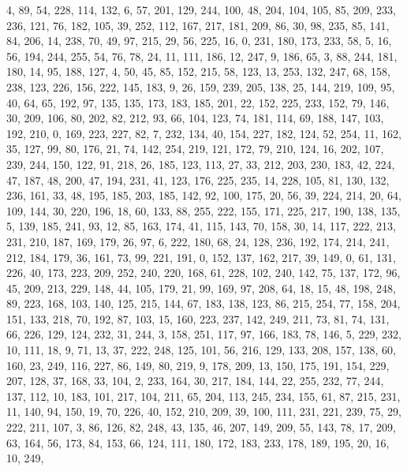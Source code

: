 \begin{DoxyCode}
       4, 89, 54, 228, 114, 132, 6, 57, 201, 129, 244, 100, 48, 204, 104, 105, 85, 209, 233, 236, 121, 76, 182, 105,
       39, 252, 112, 167, 217, 181, 209, 86, 30, 98, 235, 85, 141, 84, 206, 14, 238, 70, 49, 97, 215, 29, 56, 225,
       16, 0, 231, 180, 173, 233, 58, 5, 16, 56, 194, 244, 255, 54, 76, 78, 24, 11, 111, 186, 12, 247, 9, 186, 65,
       3, 88, 244, 181, 180, 14, 95, 188, 127, 4, 50, 45, 85, 152, 215, 58, 123, 13, 253, 132, 247, 68, 158, 238,
       123, 226, 156, 222, 145, 183, 9, 26, 159, 239, 205, 138, 25, 144, 219, 109, 95, 40, 64, 65, 192, 97, 135,
       135, 173, 183, 185, 201, 22, 152, 225, 233, 152, 79, 146, 30, 209, 106, 80, 202, 82, 212, 93, 66, 104, 123,
       74, 181, 114, 69, 188, 147, 103, 192, 210, 0, 169, 223, 227, 82, 7, 232, 134, 40, 154, 227, 182, 124, 52, 254,
       11, 162, 35, 127, 99, 80, 176, 21, 74, 142, 254, 219, 121, 172, 79, 210, 124, 16, 202, 107, 239, 244, 150,
       122, 91, 218, 26, 185, 123, 113, 27, 33, 212, 203, 230, 183, 42, 224, 47, 187, 48, 200, 47, 194, 231, 41,
       123, 176, 225, 235, 14, 228, 105, 81, 130, 132, 236, 161, 33, 48, 195, 185, 203, 185, 142, 92, 100, 175, 20,
       56, 39, 224, 214, 20, 64, 109, 144, 30, 220, 196, 18, 60, 133, 88, 255, 222, 155, 171, 225, 217, 190, 138,
       135, 5, 139, 185, 241, 93, 12, 85, 163, 174, 41, 115, 143, 70, 158, 30, 14, 117, 222, 213, 231, 210, 187, 169,
       179, 26, 97, 6, 222, 180, 68, 24, 128, 236, 192, 174, 214, 241, 212, 184, 179, 36, 161, 73, 99, 221, 191,
       0, 152, 137, 162, 217, 39, 149, 0, 61, 131, 226, 40, 173, 223, 209, 252, 240, 220, 168, 61, 228, 102, 240,
       142, 75, 137, 172, 96, 45, 209, 213, 229, 148, 44, 105, 179, 21, 99, 169, 97, 208, 64, 18, 15, 48, 198, 248,
       89, 223, 168, 103, 140, 125, 215, 144, 67, 183, 138, 123, 86, 215, 254, 77, 158, 204, 151, 133, 218, 70, 192,
       87, 103, 15, 160, 223, 237, 142, 249, 211, 73, 81, 74, 131, 66, 226, 129, 124, 232, 31, 244, 3, 158, 251,
       117, 97, 166, 183, 78, 146, 5, 229, 232, 10, 111, 18, 9, 71, 13, 37, 222, 248, 125, 101, 56, 216, 129, 133,
       208, 157, 138, 60, 160, 23, 249, 116, 227, 86, 149, 80, 219, 9, 178, 209, 13, 150, 175, 191, 154, 229, 207,
       128, 37, 168, 33, 104, 2, 233, 164, 30, 217, 184, 144, 22, 255, 232, 77, 244, 137, 112, 10, 183, 101, 217,
       104, 211, 65, 204, 113, 245, 234, 155, 61, 87, 215, 231, 11, 140, 94, 150, 19, 70, 226, 40, 152, 210, 209, 39,
       100, 111, 231, 221, 239, 75, 29, 222, 211, 107, 3, 86, 126, 82, 248, 43, 135, 46, 207, 149, 209, 55, 143,
       78, 17, 209, 63, 164, 56, 173, 84, 153, 66, 124, 111, 180, 172, 183, 233, 178, 189, 195, 20, 16, 10, 249,

\end{DoxyCode}
